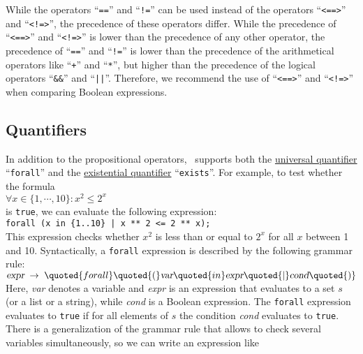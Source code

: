 While the operators ``\texttt{==}'' and ``\texttt{!=}'' can be used instead of the operators
``\texttt{<==>}'' and ``\texttt{<!=>}'', the precedence of these operators 
differ.  While the precedence of ``\texttt{<==>}'' and ``\texttt{<!=>}'' is lower than the
precedence of any other operator,  the precedence of ``\texttt{==}'' and ``\texttt{!=}'' is lower
than the precedence of the arithmetical operators like ``\texttt{+}'' and ``\texttt{*}'', but higher
than the precedence of the logical operators ``\texttt{\&\&}'' and ``\texttt{||}''.  Therefore, we
recommend the use of ``\texttt{<==>}'' and ``\texttt{<!=>}'' when comparing Boolean expressions.

\subsection{Quantifiers}
In addition to the propositional operators, \setlx\ supports both the
\href{https://en.wikipedia.org/wiki/Universal_quantification}{universal quantifier} 
``\texttt{forall}'' and the 
\href{https://en.wikipedia.org/wiki/Existential_quantification}{existential quantifier} ``\texttt{exists}''.
For example, to test whether the formula  
\\[0.2cm]
\hspace*{1.3cm}
$\forall x \in \{ 1, \cdots, 10 \}: x^2 \leq 2^x$
\\[0.2cm]
is \texttt{true}, we can evaluate the following expression:
\\[0.2cm]
\hspace*{1.3cm}
\texttt{forall (x in \{1..10\} | x ** 2 <= 2 ** x);}
\\[0.2cm]
This expression checks whether $x^2$ is less than or equal to $2^x$ for all $x$ between 1 and
10.  Syntactically, a \texttt{forall} expression is described by the following grammar
rule: 
\\[0.2cm]
\hspace*{1.3cm}
$\textsl{expr} \;\rightarrow\; \quoted{forall} \quoted{(} \textsl{var} \quoted{in}
 \textsl{expr} \quoted{|} \textsl{cond} \quoted{)}
$
\\[0.2cm]
Here, \textsl{var} denotes a variable and \textsl{expr} is an expression that evaluates
to a set $s$ (or a list  or a string), while \textsl{cond} is a Boolean expression.  The
\texttt{forall} expression evaluates to \texttt{true} if for all elements of $s$ the
condition \textsl{cond} evaluates to \texttt{true}.  There is a generalization of the grammar rule 
that allows to check several variables simultaneously, so we can write an expression like
